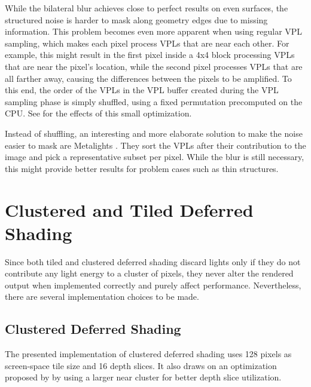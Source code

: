 While the bilateral blur achieves close to perfect results on even surfaces, the structured noise is harder to mask along geometry edges due to missing information. This problem becomes even more apparent when using regular VPL sampling, which makes each pixel process VPLs that are near each other. For example, this might result in the first pixel inside a 4x4 block processing VPLs that are near the pixel's location, while the second pixel processes VPLs that are all farther away, causing the differences between the pixels to be amplified. To this end, the order of the VPLs in the VPL buffer created during the VPL sampling phase is simply shuffled, using a fixed permutation precomputed on the CPU. See  for the effects of this small optimization.

Instead of shuffling, an interesting and more elaborate solution to make the noise easier to mask are Metalights \citep{Faure:2010:Metalights}. They sort the VPLs after their contribution to the image and pick a representative subset per pixel. While the blur is still necessary, this might provide better results for problem cases such as thin structures.


\section{Clustered and Tiled Deferred Shading}
\label{sec:impl:clusteredShading}

Since both tiled and clustered deferred shading discard lights only if they do not contribute any light energy to a cluster of pixels, they never alter the rendered output when implemented correctly and purely affect performance. Nevertheless, there are several implementation choices to be made.


\subsection{Clustered Deferred Shading}

The presented implementation of clustered deferred shading uses 128 pixels as screen-space tile size and 16 depth slices. It also draws on an optimization proposed by \citet{persson::2013::practical} by using a larger near cluster for better depth slice utilization.

